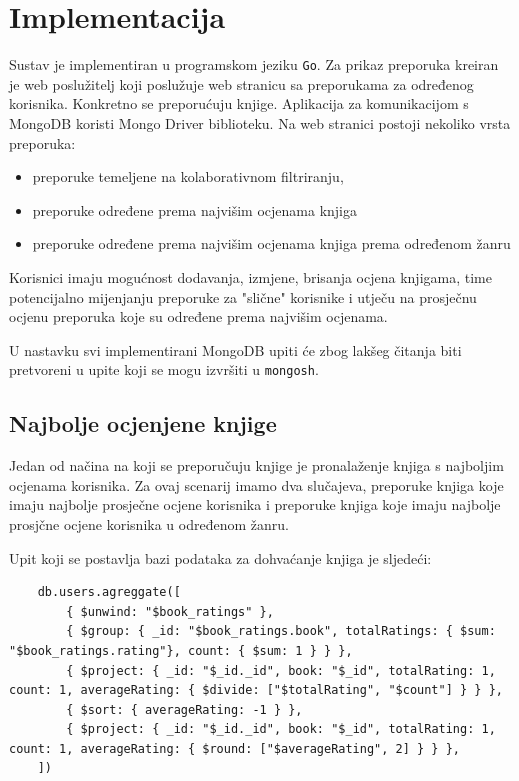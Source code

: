 \documentclass[]{foi}
\begin{document}
\section{Implementacija}

Sustav je implementiran u programskom jeziku \texttt{Go}. Za prikaz preporuka kreiran je web poslužitelj koji poslužuje web stranicu sa preporukama za
određenog korisnika. Konkretno se preporućuju knjige. Aplikacija za komunikacijom s MongoDB koristi Mongo Driver biblioteku.
Na web stranici postoji nekoliko vrsta preporuka:
\begin{itemize}
	\item preporuke temeljene na kolaborativnom filtriranju,
	\item preporuke određene prema najvišim ocjenama knjiga
	\item preporuke određene prema najvišim ocjenama knjiga prema određenom žanru
\end{itemize}
Korisnici imaju mogućnost dodavanja, izmjene, brisanja ocjena knjigama, time potencijalno mijenjanju preporuke za "slične" korisnike
i utječu na prosječnu ocjenu preporuka koje su određene prema najvišim ocjenama.

U nastavku svi implementirani MongoDB upiti će zbog lakšeg čitanja biti pretvoreni u upite koji se mogu izvršiti u \texttt{mongosh}.

\subsection{Najbolje ocjenjene knjige}

Jedan od načina na koji se preporučuju knjige je pronalaženje knjiga s najboljim ocjenama korisnika.
Za ovaj scenarij imamo dva slučajeva, preporuke knjiga koje imaju najbolje prosječne ocjene korisnika
i preporuke knjiga koje imaju najbolje prosjčne ocjene korisnika u određenom žanru.

Upit koji se postavlja bazi podataka za dohvaćanje knjiga je sljedeći:
\begin{verbatim}
    db.users.agreggate([
        { $unwind: "$book_ratings" },
        { $group: { _id: "$book_ratings.book", totalRatings: { $sum: "$book_ratings.rating"}, count: { $sum: 1 } } },
        { $project: { _id: "$_id._id", book: "$_id", totalRating: 1, count: 1, averageRating: { $divide: ["$totalRating", "$count"] } } },
        { $sort: { averageRating: -1 } },
        { $project: { _id: "$_id._id", book: "$_id", totalRating: 1, count: 1, averageRating: { $round: ["$averageRating", 2] } } },
    ])
\end{verbatim}
\label{lst:najbolje_ocjene_knjiga}
\end{document}
